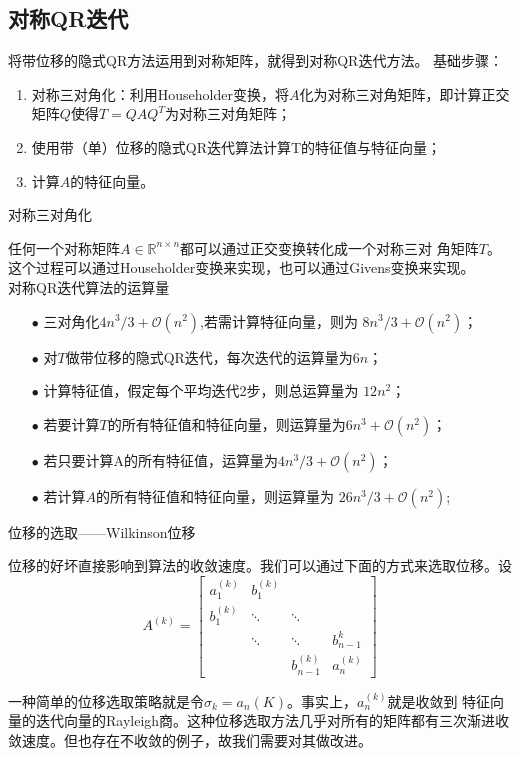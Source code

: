 \documentclass[12pt,a4paper]{article}
\begin{document}
\subsection{对称QR迭代}
将带位移的隐式QR方法运用到对称矩阵，就得到对称QR迭代方法。
基础步骤：
\begin{enumerate}[1.]
    \item 对称三对角化：利用Householder变换，将$A$化为对称三对角矩阵，即计算正交
        矩阵$Q$使得$T=QAQ^T$为对称三对角矩阵；
    \item 使用带（单）位移的隐式QR迭代算法计算T的特征值与特征向量；
    \item 计算$A$的特征向量。
    \end{enumerate}
对称三对角化

任何一个对称矩阵$A\in \mathbb R^{n\times n}$都可以通过正交变换转化成一个对称三对
角矩阵$T$。这个过程可以通过Householder变换来实现，也可以通过Givens变换来实现。\\
对称QR迭代算法的运算量
\begin{itemize}
    \item[$\bullet$] 三对角化$4n^3/3+\mathcal O(n^2)$,若需计算特征向量，则为
        $8n^3/3+\mathcal O(n^2)$；
    \item[$\bullet$] 对$T$做带位移的隐式QR迭代，每次迭代的运算量为$6n$；
    \item[$\bullet$] 计算特征值，假定每个平均迭代2步，则总运算量为
            $12n^2$；
        \item[$\bullet$] 若要计算$T$的所有特征值和特征向量，则运算量为$6n^3+\mathcal
        O(n^2)$；
    \item[$\bullet$] 若只要计算A的所有特征值，运算量为$4n^3/3+\mathcal O(n^2)$；
    \item[$\bullet$] 若计算$A$的所有特征值和特征向量，则运算量为
            $26n^3/3+\mathcal O(n^2)$;
\end{itemize}

位移的选取——Wilkinson位移

位移的好坏直接影响到算法的收敛速度。我们可以通过下面的方式来选取位移。设
$$A^{(k)}=\begin{bmatrix}
        a_1^{(k)}&b_1^{(k)}&&\\
        b_1^{(k)}&\ddots &\ddots &\\
        &\ddots &\ddots &b_{n-1}^{k}\\
        &&b_{n-1}^{(k)}&a_n^{(k)}
\end{bmatrix}$$

一种简单的位移选取策略就是令$\sigma _k=a_n{(K)}$。事实上，$a_n^{(k)}$就是收敛到
特征向量的迭代向量的Rayleigh商。这种位移选取方法几乎对所有的矩阵都有三次渐进收敛速度。但也存在不收敛的例子，故我们需要对其做改进。
\end{document}
